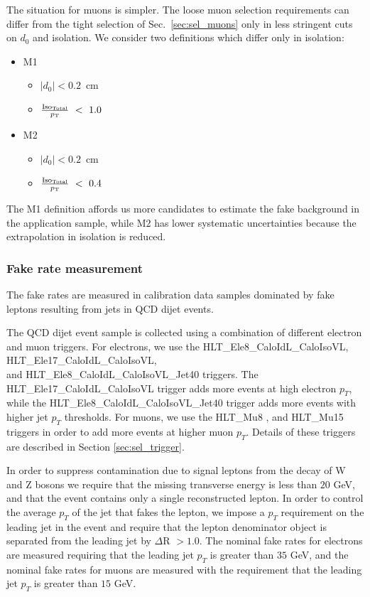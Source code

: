 The situation for muons is simpler. The loose muon selection requirements can differ from
the tight selection of Sec.~\ref{sec:sel_muons} only in less stringent cuts on $d_0$
and isolation. We consider two definitions which differ only in isolation:
\begin{itemize}
  \item M1
  \begin{itemize}
    \item $|d_{0}| < 0.2$~cm
    \item $\frac{\rm{Iso}_{Total}}{p_\mathrm{T}}~<~1.0$
  \end{itemize}
  \item M2 
  \begin{itemize}
    \item $|d_{0}| < 0.2$~cm
    \item $\frac{\rm{Iso}_{Total}}{p_\mathrm{T}}~<~0.4$
  \end{itemize}
\end{itemize}
The M1 definition affords us more candidates to estimate the fake background in the
application sample, while M2 has lower systematic uncertainties because the extrapolation
in isolation is reduced.


\subsubsection{Fake rate measurement}
\label{sec:fakerateMeasurement}
The fake rates are measured in calibration data samples dominated by fake leptons 
resulting from jets in QCD dijet events. 

The QCD dijet event sample is collected using a combination of different 
electron and muon triggers. For electrons, we use the 
{HLT\_Ele8\_CaloIdL\_CaloIsoVL}, {HLT\_Ele17\_CaloIdL\_CaloIsoVL}, \\ 
and {HLT\_Ele8\_CaloIdL\_CaloIsoVL\_Jet40} triggers. The 
{HLT\_Ele17\_CaloIdL\_CaloIsoVL} trigger adds more events at high electron
$p_{T}$, while the {HLT\_Ele8\_CaloIdL\_CaloIsoVL\_Jet40} trigger adds more
events with higher jet $p_{T}$ thresholds. For muons, we use the
{ HLT\_Mu8 }, and { HLT\_Mu15 } triggers in order to add more events at 
higher muon $p_{T}$. Details of these triggers are described 
in Section \ref{sec:sel_trigger}. 

In order to suppress 
contamination due to signal leptons from the decay of W and Z bosons we require
that the missing transverse energy is less than $20$ GeV, and that 
the event contains only a single reconstructed lepton. In order to control the 
average $p_{T}$ of the jet that fakes the lepton, we impose a $p_{T}$ requirement 
on the leading jet in the event and require that the lepton denominator object is 
separated from the leading jet by $\Delta$R $ > 1.0$. The nominal fake rates for
electrons are measured requiring that the leading jet $p_{T}$ is greater than 
$35$ GeV, and the nominal fake rates for muons are measured with the requirement 
that the leading jet $p_{T}$ is greater than $15$ GeV.

